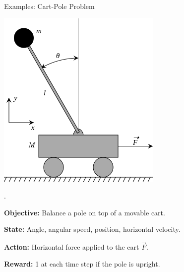 \documentclass{beamer}
\begin{document}
	\begin{frame}{Examples: Cart-Pole Problem}
		\begin{minipage}{3cm}
			\centering
			\includegraphics[width=\textwidth]{cartPole.png}
		\end{minipage}%
		\begin{minipage}{1cm}
			.
		\end{minipage}%
		\begin{minipage}{7cm}
			\textbf{Objective:} Balance a pole on top of a movable cart.
			
			\textbf{State:} Angle, angular speed, position, horizontal velocity.
			
			\textbf{Action:} Horizontal force applied to the cart $ \vec{F} $.
			
			\textbf{Reward:} 1 at each time step if the pole is upright.
		\end{minipage}
	\end{frame}
	
\end{document}

